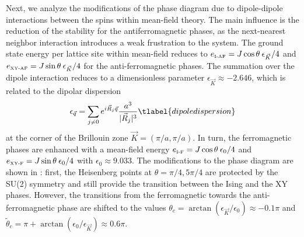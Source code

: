 Next, we analyze the modifications of the phase diagram due to dipole-dipole
interactions between the spins within mean-field theory. The
main influence is the reduction of the stability for the antiferromagnetic
phases, as the next-nearest neighbor interaction introduces a weak frustration
to the system. The ground state energy per lattice site within mean-field
reduces to $ e_{\mbox{\tiny I-AF}} = J \cos \theta \: \epsilon_{\vec K}/4$ and $e_{\mbox{\tiny XY-AF}} = J \sin \theta \: \epsilon_{\vec K}/4$
for the anti-ferromagnetic phases. The summation over the dipole interaction
reduces to a dimensionless parameter $\epsilon_{\vec K} \approx -2.646$, which is related to
the dipolar dispersion
%
\begin{equation}
  \epsilon_{\vec q} = \sum_{j \neq 0} e^{i {\vec R}_{j} {\vec q}}\frac{a^3}{|{\vec R}_{j}|^3}
  \tlabel{dipoledispersion}
\end{equation}
%
at the corner of the Brillouin zone ${\vec K} = (\pi/a, \pi /a)$.
In turn, the ferromagnetic phases are enhanced with a mean-field energy
$e_{\mbox{\tiny I-F}} = J \cos \theta \: \epsilon_0/4 $ and $ e_{\mbox{\tiny XY-F}} = J \sin \theta \: \epsilon_0/4$
with $\epsilon_{0} \approx 9.033$. The modifications to the
phase diagram are shown in : first, the Heisenberg points at
$\theta = \pi/4, 5 \pi/4$ are protected by the SU(2) symmetry and still
provide the transition between the Ising and the XY phases. However, the
transitions from the ferromagnetic towards the anti-ferromagnetic phase are
shifted to the values $\theta_{c}= \arctan(\epsilon_{\vec K}/\epsilon_{0})
\approx -0.1 \pi$ and $\tilde{\theta}_c = \pi+ \arctan(\epsilon_{0}/\epsilon_{\vec K})\approx 0.6 \pi$.




